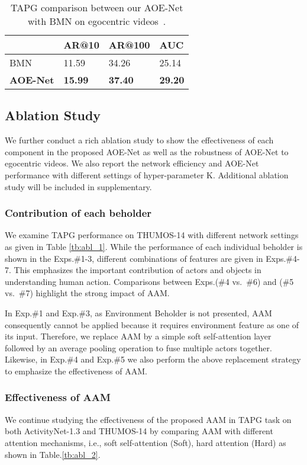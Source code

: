 \documentclass[sn-mathphys]{sn-jnl}
\theoremstyle{thmstyleone}\newtheorem{theorem}{Theorem}\newtheorem{proposition}[theorem]{Proposition}
\theoremstyle{thmstyletwo}\newtheorem{example}{Example}\newtheorem{remark}{Remark}
\theoremstyle{thmstylethree}\newtheorem{definition}{Definition}
\begin{document}
\begin{table}[!t]
\centering
\begin{tabular}{l|lll}
      & AR@10 & AR@100 & AUC \\ \hline \hline
      BMN\cite{bmn} & 11.59 & 34.26 & 25.14 \\
      \textbf{AOE-Net}  & \textbf{15.99} & \textbf{37.40} & \textbf{29.20} \\ \bottomrule
\end{tabular}
\caption{TAPG comparison between our AOE-Net with BMN \cite{bmn} on egocentric videos~\cite{damen2021rescaling}.} \label{tb:abl_3}
\end{table}

\subsection{Ablation Study}

We further conduct a rich ablation study to show the effectiveness of each component in the proposed AOE-Net as well as the robustness of AOE-Net to egocentric videos. We also report the network efficiency and AOE-Net performance with different settings of hyper-parameter K. Additional ablation study will be included in supplementary.

\subsubsection{Contribution of each beholder}
We examine TAPG performance on THUMOS-14 with different network settings as given in Table \ref{tb:abl_1}. While the performance of each individual beholder 
is shown in the Exps.\#1-3, different combinations of features are given in Exps.\#4-7. This emphasizes the important contribution of actors and objects in understanding human action. Comparisons between Exps.(\#4 vs.~\#6) and (\#5 vs.~\#7) highlight the strong impact of AAM.

In Exp.\#1 and Exp.\#3, as Environment Beholder is not presented, AAM consequently cannot be applied because it requires environment feature as one of its input. Therefore, we replace AAM by a simple soft self-attention layer followed by an average pooling operation to fuse multiple actors together.
Likewise, in Exp.\#4 and Exp.\#5 we also perform the above replacement strategy to emphasize the effectiveness of AAM.

\subsubsection{Effectiveness of AAM}
We continue studying the effectiveness of the proposed AAM in TAPG task on both ActivityNet-1.3 and THUMOS-14 by comparing AAM with different attention mechanisms, i.e., soft self-attention \cite{attention_is_all_you_need} (Soft), hard attention \cite{adahard_eccv2018} (Hard) as shown in Table.\ref{tb:abl_2}.
\end{document}
